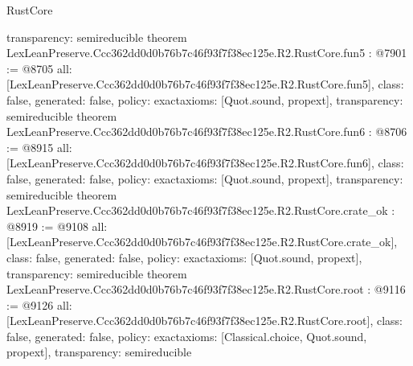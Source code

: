 \begin{lexlean}{RustCore}
\begin{coremodule}
{  transparency: semireducible
}
theorem LexLeanPreserve.Ccc362dd0d0b76b7c46f93f7f38ec125e.R2.RustCore.fun5 : @7901 := @8705 {
  all: [LexLeanPreserve.Ccc362dd0d0b76b7c46f93f7f38ec125e.R2.RustCore.fun5],
  class: false,
  generated: false,
  policy: exact{axioms: [Quot.sound, propext]},
  transparency: semireducible
}
theorem LexLeanPreserve.Ccc362dd0d0b76b7c46f93f7f38ec125e.R2.RustCore.fun6 : @8706 := @8915 {
  all: [LexLeanPreserve.Ccc362dd0d0b76b7c46f93f7f38ec125e.R2.RustCore.fun6],
  class: false,
  generated: false,
  policy: exact{axioms: [Quot.sound, propext]},
  transparency: semireducible
}
theorem LexLeanPreserve.Ccc362dd0d0b76b7c46f93f7f38ec125e.R2.RustCore.crate_ok : @8919 := @9108 {
  all: [LexLeanPreserve.Ccc362dd0d0b76b7c46f93f7f38ec125e.R2.RustCore.crate_ok],
  class: false,
  generated: false,
  policy: exact{axioms: [Quot.sound, propext]},
  transparency: semireducible
}
theorem LexLeanPreserve.Ccc362dd0d0b76b7c46f93f7f38ec125e.R2.RustCore.root : @9116 := @9126 {
  all: [LexLeanPreserve.Ccc362dd0d0b76b7c46f93f7f38ec125e.R2.RustCore.root],
  class: false,
  generated: false,
  policy: exact{axioms: [Classical.choice, Quot.sound, propext]},
  transparency: semireducible
}


\end{coremodule}
\end{lexlean}
